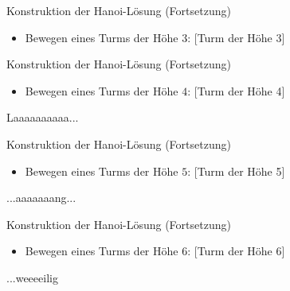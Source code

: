 \begin{frame}
\begin{block}{Konstruktion der Hanoi-Lösung (Fortsetzung)}
	\begin{itemize}
	\item Bewegen eines Turms der Höhe $3$:
	[Turm der Höhe 3]
	\end{itemize}
\end{block}
\begin{block}{}
\end{block}
\end{frame}

\begin{frame}
\begin{block}{Konstruktion der Hanoi-Lösung (Fortsetzung)}
	\begin{itemize}
	\item Bewegen eines Turms der Höhe $4$:
	[Turm der Höhe 4]
	\end{itemize}
\end{block}
\begin{block}{Laaaaaaaaaa...}
\end{block}
\end{frame}

\begin{frame}
	\begin{block}{Konstruktion der Hanoi-Lösung (Fortsetzung)}
		\begin{itemize}
		\item Bewegen eines Turms der Höhe $5$:
		[Turm der Höhe 5]
		\end{itemize}
	\end{block}
	\begin{block}{...aaaaaaang...}
	\end{block}
\end{frame}

\begin{frame}
	\begin{block}{Konstruktion der Hanoi-Lösung (Fortsetzung)}
		\begin{itemize}
		\item Bewegen eines Turms der Höhe $6$:
		[Turm der Höhe 6]
		\end{itemize}
	\end{block}
	\begin{block}{...weeeeilig}
	\end{block}
	\end{frame}

